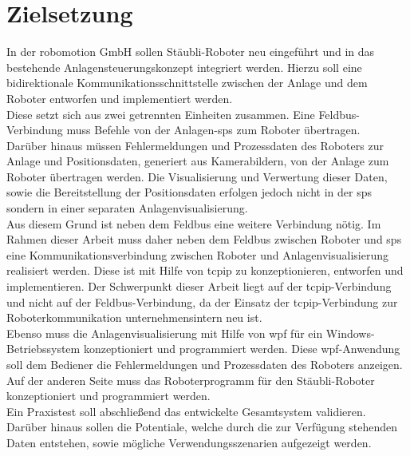 \documentclass[ a4paper,
                oneside,
                toc=bibliography,
                toc=listof
                ]{scrbook}
\begin{document}
	\section{Zielsetzung}
	In der \glqq robomotion GmbH\grqq{} sollen Stäubli-Roboter neu eingeführt und in das bestehende Anlagensteuerungskonzept integriert werden. Hierzu soll eine bidirektionale Kommunikationsschnittstelle zwischen der Anlage und dem Roboter entworfen und implementiert werden. \\
	Diese setzt sich aus zwei getrennten Einheiten zusammen. Eine Feldbus-Verbindung muss Befehle von der Anlagen-\ac{sps} zum Roboter übertragen.\\
	Darüber hinaus müssen Fehlermeldungen und Prozessdaten des Roboters zur Anlage und Positionsdaten, generiert aus Kamerabildern, von der Anlage zum Roboter übertragen werden. Die Visualisierung und Verwertung dieser Daten, sowie die Bereitstellung der Positionsdaten erfolgen jedoch nicht in der \ac{sps} sondern in einer separaten Anlagenvisualisierung.\\
	Aus diesem Grund ist neben dem Feldbus eine weitere Verbindung nötig. Im Rahmen dieser Arbeit muss daher neben dem Feldbus zwischen Roboter und \ac{sps} eine Kommunikationsverbindung zwischen Roboter und Anlagenvisualisierung realisiert werden. Diese ist mit Hilfe von \ac{tcpip} zu konzeptionieren, entworfen und implementieren. Der Schwerpunkt dieser Arbeit liegt auf der \ac{tcpip}-Verbindung und nicht auf der Feldbus-Verbindung, da der Einsatz der \ac{tcpip}-Verbindung zur Roboterkommunikation unternehmensintern neu ist.\\
	Ebenso muss die Anlagenvisualisierung mit Hilfe von \ac{wpf} für ein Windows-Betriebssystem konzeptioniert und programmiert werden. Diese \ac{wpf}-Anwendung soll dem Bediener die Fehlermeldungen und Prozessdaten des Roboters anzeigen. Auf der anderen Seite muss das Roboterprogramm für den Stäubli-Roboter konzeptioniert und programmiert werden. \\
	Ein Praxistest soll abschließend das entwickelte Gesamtsystem validieren. Darüber hinaus sollen die Potentiale, welche durch die zur Verfügung stehenden Daten entstehen, sowie mögliche Verwendungsszenarien aufgezeigt werden.
	
\end{document}
